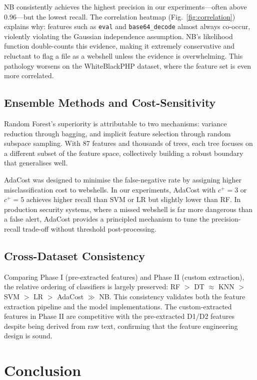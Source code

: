 \documentclass[journal,twocolumn]{IEEEtran}
\begin{document}
NB consistently achieves the highest precision in our experiments---often above 0.96---but the lowest recall. The correlation heatmap (Fig.~\ref{fig:correlation}) explains why: features such as \texttt{eval} and \texttt{base64\_decode} almost always co-occur, violently violating the Gaussian independence assumption. NB's likelihood function double-counts this evidence, making it extremely conservative and reluctant to flag a file as a webshell unless the evidence is overwhelming. This pathology worsens on the WhiteBlackPHP dataset, where the feature set is even more correlated.

\subsection{Ensemble Methods and Cost-Sensitivity}

Random Forest's superiority is attributable to two mechanisms: variance reduction through bagging, and implicit feature selection through random subspace sampling. With 87 features and thousands of trees, each tree focuses on a different subset of the feature space, collectively building a robust boundary that generalises well.

AdaCost was designed to minimise the false-negative rate by assigning higher misclassification cost to webshells. In our experiments, AdaCost with $c^+ = 3$ or $c^+ = 5$ achieves higher recall than SVM or LR but slightly lower than RF. In production security systems, where a missed webshell is far more dangerous than a false alert, AdaCost provides a principled mechanism to tune the precision-recall trade-off without threshold post-processing.

\subsection{Cross-Dataset Consistency}

Comparing Phase I (pre-extracted features) and Phase II (custom extraction), the relative ordering of classifiers is largely preserved: RF $>$ DT $\approx$ KNN $>$ SVM $>$ LR $>$ AdaCost $\gg$ NB. This consistency validates both the feature extraction pipeline and the model implementations. The custom-extracted features in Phase II are competitive with the pre-extracted D1/D2 features despite being derived from raw text, confirming that the feature engineering design is sound.

\section{Conclusion}
\end{document}

